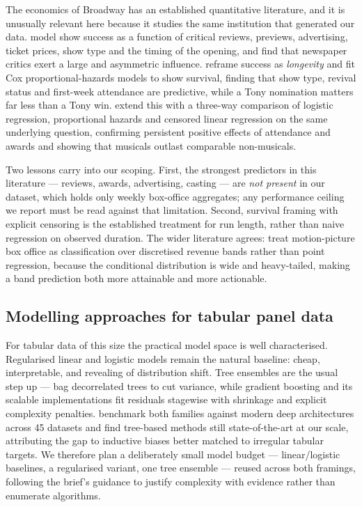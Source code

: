 The economics of Broadway has an established quantitative literature, and it is
unusually relevant here because it studies the same institution that generated
our data. \citet{reddy1998broadway} model show success as a function of critical
reviews, previews, advertising, ticket prices, show type and the timing of the
opening, and find that newspaper critics exert a large and asymmetric influence.
\citet{simonoff2003broadway} reframe success as \emph{longevity} and fit Cox
proportional-hazards models \citep{cox1972regression} to show survival, finding
that show type, revival status and first-week attendance are predictive, while a
Tony nomination matters far less than a Tony win. \citet{simonoff2016survival}
extend this with a three-way comparison of logistic regression, proportional
hazards and censored linear regression on the same underlying question,
confirming persistent positive effects of attendance and awards and showing that
musicals outlast comparable non-musicals.

Two lessons carry into our scoping. First, the strongest predictors in this
literature --- reviews, awards, advertising, casting --- are \emph{not present}
in our dataset, which holds only weekly box-office aggregates; any performance
ceiling we report must be read against that limitation. Second, survival framing
with explicit censoring is the established treatment for run length, rather than
naive regression on observed duration. The wider literature agrees:
\citet{sharda2006boxoffice} treat motion-picture box office as classification
over discretised revenue bands rather than point regression, because the
conditional distribution is wide and heavy-tailed, making a band prediction both
more attainable and more actionable.

\subsection{Modelling approaches for tabular panel data}

For tabular data of this size the practical model space is well characterised.
Regularised linear and logistic models remain the natural baseline: cheap,
interpretable, and revealing of distribution shift. Tree ensembles are the usual
step up --- \citet{breiman2001rf} bag decorrelated trees to cut variance, while
gradient boosting \citep{friedman2001gbm} and its scalable implementations
\citep{chen2016xgboost} fit residuals stagewise with shrinkage and explicit
complexity penalties. \citet{grinsztajn2022tabular} benchmark both families
against modern deep architectures across 45 datasets and find tree-based methods
still state-of-the-art at our scale, attributing the gap to inductive biases
better matched to irregular tabular targets. We therefore plan a deliberately
small model budget --- linear/logistic baselines, a regularised variant, one
tree ensemble --- reused across both framings, following the brief's guidance to
justify complexity with evidence rather than enumerate algorithms.

